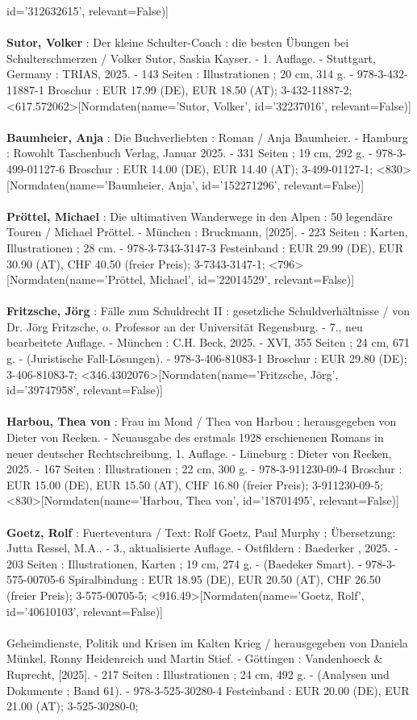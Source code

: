 \documentclass{article}
\begin{document}
\begin{multicols}{3}
id='312632615', relevant=False)]\\\\\textbf{Sutor, Volker} : Der kleine Schulter-Coach : die besten Übungen bei Schulterschmerzen / Volker Sutor, Saskia Kayser. - 1. Auflage. - Stuttgart, Germany : TRIAS, 2025. - 143 Seiten : Illustrationen ; 20 cm, 314 g. - 978-3-432-11887-1 Broschur : EUR 17.99 (DE), EUR 18.50 (AT); 3-432-11887-2; <617.572062>[Normdaten(name='Sutor, Volker', id='32237016', relevant=False)]\\\\\textbf{Baumheier, Anja} : Die Buchverliebten : Roman / Anja Baumheier. - Hamburg : Rowohlt Taschenbuch Verlag, Januar 2025. - 331 Seiten ; 19 cm, 292 g. - 978-3-499-01127-6 Broschur : EUR 14.00 (DE), EUR 14.40 (AT); 3-499-01127-1; <830>[Normdaten(name='Baumheier, Anja', id='152271296', relevant=False)]\\\\\textbf{Pröttel, Michael} : Die ultimativen Wanderwege in den Alpen : 50 legendäre Touren / Michael Pröttel. - München : Bruckmann, [2025]. - 223 Seiten : Karten, Illustrationen ; 28 cm. - 978-3-7343-3147-3 Festeinband : EUR 29.99 (DE), EUR 30.90 (AT), CHF 40.50 (freier Preis); 3-7343-3147-1; <796>[Normdaten(name='Pröttel, Michael', id='22014529', relevant=False)]\\\\\textbf{Fritzsche, Jörg} : Fälle zum Schuldrecht II : gesetzliche Schuldverhältnisse / von Dr. Jörg Fritzsche, o. Professor an der Universität Regensburg. - 7., neu bearbeitete Auflage. - München : C.H. Beck, 2025. - XVI, 355 Seiten ; 24 cm, 671 g. - (Juristische Fall-Lösungen). - 978-3-406-81083-1 Broschur : EUR 29.80 (DE); 3-406-81083-7; <346.4302076>[Normdaten(name='Fritzsche, Jörg', id='39747958', relevant=False)]\\\\\textbf{Harbou, Thea von} : Frau im Mond / Thea von Harbou ; herausgegeben von Dieter von Reeken. - Neuausgabe des erstmals 1928 erschienenen Romans in neuer deutscher Rechtschreibung, 1. Auflage. - Lüneburg : Dieter von Reeken, 2025. - 167 Seiten : Illustrationen ; 22 cm, 300 g. - 978-3-911230-09-4 Broschur : EUR 15.00 (DE), EUR 15.50 (AT), CHF 16.80 (freier Preis); 3-911230-09-5; <830>[Normdaten(name='Harbou, Thea von', id='18701495', relevant=False)]\\\\\textbf{Goetz, Rolf} : Fuerteventura / Text: Rolf Goetz, Paul Murphy ; Übersetzung: Jutta Ressel, M.A.. - 3.,  aktualisierte Auflage. - Ostfildern : Baederker   , 2025. - 203 Seiten : Illustrationen, Karten ; 19 cm, 274 g. - (Baedeker Smart). - 978-3-575-00705-6 Spiralbindung : EUR 18.95 (DE), EUR 20.50 (AT), CHF 26.50 (freier Preis); 3-575-00705-5; <916.49>[Normdaten(name='Goetz, Rolf', id='40610103', relevant=False)]\\\\Geheimdienste, Politik und Krisen im Kalten Krieg / herausgegeben von Daniela Münkel, Ronny Heidenreich und Martin Stief. - Göttingen : Vandenhoeck \& Ruprecht, [2025]. - 217 Seiten : Illustrationen ; 24 cm, 492 g. - (Analysen und Dokumente ; Band 61). - 978-3-525-30280-4 Festeinband : EUR 20.00 (DE), EUR 21.00 (AT); 3-525-30280-0; 
\end{multicols}
\end{document}
